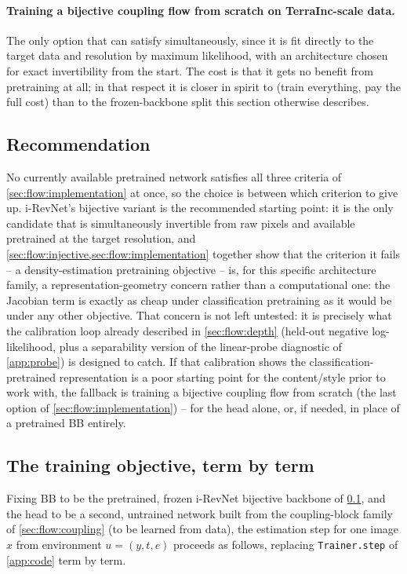 \paragraph{Training a bijective coupling flow from scratch on TerraInc-scale data.} The only option that
can satisfy  simultaneously, since it is fit directly to the target
data and resolution by maximum likelihood, with an architecture chosen for exact invertibility from the
start. The cost is that it gets no benefit from pretraining at all; in that respect it is closer in
spirit to  (train everything, pay the full cost) than to the frozen-backbone split
this section otherwise describes.

\subsection{Recommendation}
\label{sec:flow:recommendation}
No currently available pretrained network satisfies all three criteria of \cref{sec:flow:implementation}
at once, so the choice is between which criterion to give up. i-RevNet's bijective variant is the
recommended starting point: it is the only candidate that is simultaneously invertible from raw pixels
and available pretrained at the target resolution, and \cref{sec:flow:injective,sec:flow:implementation}
together show that the criterion it fails -- a density-estimation pretraining objective -- is, for this
specific architecture family, a representation-geometry concern rather than a computational one: the
Jacobian term is exactly as cheap under classification pretraining as it would be under any other
objective. That concern is not left untested: it is precisely what the calibration loop already described
in \cref{sec:flow:depth} (held-out negative log-likelihood, plus a separability version of the
linear-probe diagnostic of \cref{app:probe}) is designed to catch. If that calibration shows the
classification-pretrained representation is a poor starting point for the content/style prior to work
with, the fallback is training a bijective coupling flow from scratch (the last option of
\cref{sec:flow:implementation}) -- for the head alone, or, if needed, in place of a pretrained BB
entirely.

\subsection{The training objective, term by term}
\label{sec:flow:objective}
Fixing BB to be the pretrained, frozen i-RevNet bijective backbone of \cref{sec:flow:recommendation}, and
the head to be a second, untrained network built from the coupling-block family of \cref{sec:flow:coupling}
(to be learned from data), the estimation step for one image $x$ from environment $u=(y,t,e)$ proceeds as
follows, replacing \texttt{Trainer.step} of \cref{app:code} term by term.

